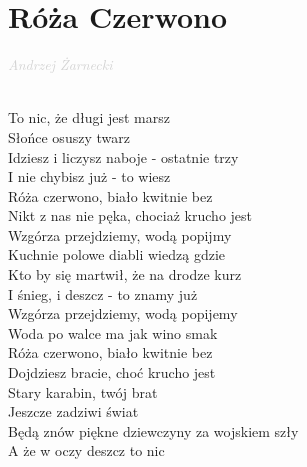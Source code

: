 \documentclass[a5paper, 10pt]{book}
\begin{document}
\section{Róża Czerwono}\textcolor{lightgray}{\textit{Andrzej Żarnecki}}\\~\\
\begin{minipage}[t]{0.7\textwidth}
To nic, że długi jest marsz\\
Słońce osuszy twarz\\
Idziesz i liczysz naboje - ostatnie trzy\\
I nie chybisz już - to wiesz\\

\hspace*{5mm}Róża czerwono, biało kwitnie bez\\
\hspace*{5mm}Nikt z nas nie pęka, chociaż krucho jest\\
\hspace*{5mm}Wzgórza przejdziemy, wodą popijmy\\
\hspace*{5mm}Kuchnie polowe diabli wiedzą gdzie\\
\hspace*{5mm}Kto by się martwił, że na drodze kurz\\
\hspace*{5mm}I śnieg, i deszcz - to znamy już\\
\hspace*{5mm}Wzgórza przejdziemy, wodą popijemy\\
\hspace*{5mm}Woda po walce ma jak wino smak\\
\hspace*{5mm}Róża czerwono, biało kwitnie bez\\
\hspace*{5mm}Dojdziesz bracie, choć krucho jest\\

Stary karabin, twój brat\\
Jeszcze zadziwi świat\\
Będą znów piękne dziewczyny za wojskiem szły\\
A że w oczy deszcz to nic\\


\end{minipage}
\end{document}
